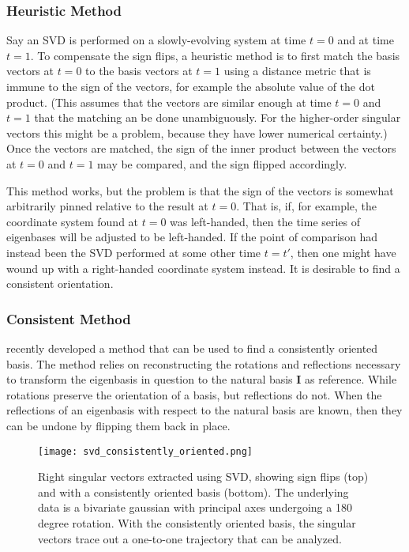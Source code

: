 \subsubsection{Heuristic Method}
Say an SVD is performed on a slowly-evolving system at time $t=0$ and at time $t=1$. To compensate the sign flips, a heuristic method is to first match the basis vectors at $t=0$ to the basis vectors at $t=1$ using a distance metric that is immune to the sign of the vectors, for example the absolute value of the dot product. (This assumes that the vectors are similar enough at time $t=0$ and $t=1$ that the matching an be done unambiguously. For the higher-order singular vectors this might be a problem, because they have lower numerical certainty.) Once the vectors are matched, the sign of the inner product between the vectors at $t=0$ and $t=1$ may be compared, and the sign flipped accordingly. 

This method works, but the problem is that the sign of the vectors is somewhat arbitrarily pinned relative to the result at $t=0$. That is, if, for example, the coordinate system found at $t=0$ was left-handed, then the time series of eigenbases will be adjusted to be left-handed. If the point of comparison had instead been the SVD performed at some other time $t=t'$, then one might have wound up with a right-handed coordinate system instead. It is desirable to find a consistent orientation.   


\subsubsection{Consistent Method}

 recently developed a method that can be used to find a consistently oriented basis. The method relies on reconstructing the rotations and reflections necessary to transform the eigenbasis in question to the natural basis $\mathbf{I}$ as reference. While rotations preserve the orientation of a basis, but reflections do not. When the reflections of an eigenbasis with respect to the natural basis are known, then they can be undone by flipping them back in place. 


\begin{figure}
\centering
    \texttt{[image: svd\_consistently\_oriented.png]}
    \caption{Right singular vectors extracted using SVD, showing sign flips (top) and with a consistently oriented basis (bottom). The underlying data is a bivariate gaussian with principal axes undergoing a 180 degree rotation. With the consistently oriented basis, the singular vectors trace out a one-to-one trajectory that can be analyzed.}
    \label{fig:svd_consistently_oriented}
\end{figure}


